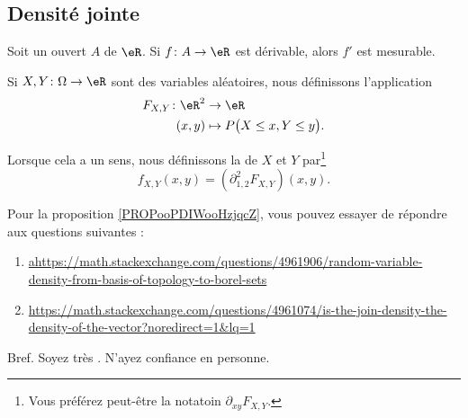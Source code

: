 \subsection{Densité jointe}

\begin{proposition}	\label{PROPooGXEOooWMAuIp}
	Soit un ouvert \( A\) de \( \eR\). Si \(f \colon A\to \eR  \) est dérivable, alors \( f'\) est mesurable.
\end{proposition}

Si \(X,Y \colon \Omega\to \eR  \) sont des variables aléatoires, nous définissons l'application
\begin{equation}
	\begin{aligned}
		F_{X,Y}\colon \eR^2 & \to \eR                               \\
		(x,y)               & \mapsto P\big( X\leq x,Y\leq y \big).
	\end{aligned}
\end{equation}

\begin{definition}	\label{DEFooUOKQooMIjDkr}
	Lorsque cela a un sens, nous définissons la  de \( X\) et \( Y\) par\footnote{Vous préférez peut-être la notatoin \( \partial_{xy}F_{X,Y}\).}
	\begin{equation}
		f_{X,Y}(x,y)=(\partial^2_{1,2}F_{X,Y})(x,y).
	\end{equation}
\end{definition}

\begin{probleme}
	Pour la proposition \ref{PROPooPDIWooHzjqcZ}, vous pouvez essayer de répondre aux questions suivantes :
	\begin{enumerate}
		\item
		      \url{ahttps://math.stackexchange.com/questions/4961906/random-variable-density-from-basis-of-topology-to-borel-sets}
		\item
		      \url{https://math.stackexchange.com/questions/4961074/is-the-join-density-the-density-of-the-vector?noredirect=1&lq=1}
	\end{enumerate}
	Bref. Soyez très . N'ayez confiance en personne.
\end{probleme}

